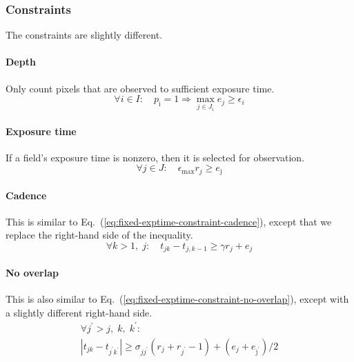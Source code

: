 \documentclass[twocolumn,times]{aastex631}
\begin{document}
\subsubsection{Constraints}

The constraints are slightly different.

\paragraph{Depth}
Only count pixels that are observed to sufficient exposure time.
%
\begin{equation}
    \label{eq:variable-exptime-constraint-depth}
    \forall i \in I :\quad p_\mathrm{i} = 1 \Rightarrow \max_{j \in J_i} e_{j} \geq \epsilon_i
\end{equation}

\paragraph{Exposure time}
If a field's exposure time is nonzero, then it is selected for observation.
%
\begin{equation}
    \label{eq:variable-exptime-constraint-exptime}
    \forall j \in J :\quad \epsilon_\mathrm{max} r_j \geq e_\mathrm{j}
\end{equation}

\paragraph{Cadence}
This is similar to Eq.~(\ref{eq:fixed-exptime-constraint-cadence}), except that we replace the right-hand side of the inequality.
%
\begin{equation}
    \label{eq:variable-exptime-constraint-cadence}
    \forall k > 1 ,\; j :\quad t_{jk} - t_{j,k-1} \geq \gamma r_j + e_j
\end{equation}

\paragraph{No overlap}
This is also similar to Eq.~(\ref{eq:fixed-exptime-constraint-no-overlap}), except with a slightly different right-hand side.
%
\begin{multline}
    \label{eq:variable-exptime-constraint-no-overlap}
    \forall j^\prime > j ,\; k ,\; k^\prime : \\ \left|t_{jk} - t_{j^\prime k^\prime}\right|  \geq \sigma_{jj^\prime} \left( r_j + r_{j^\prime} - 1\right) + (e_j + e_\mathrm{j^\prime}) / 2
\end{multline}
\end{document}

